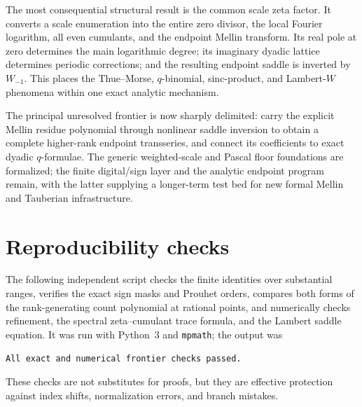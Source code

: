 \documentclass[11pt,oneside]{article}
\theoremstyle{definition}
\theoremstyle{remark}
\begin{document}
The most consequential structural result is the common scale zeta factor.  It converts a scale enumeration into the entire zero divisor, the local Fourier logarithm, all even cumulants, and the endpoint Mellin transform.  Its real pole at zero determines the main logarithmic degree; its imaginary dyadic lattice determines periodic corrections; and the resulting endpoint saddle is inverted by $W_{-1}$.  This places the Thue--Morse, $q$-binomial, sinc-product, and Lambert-$W$ phenomena within one exact analytic mechanism.

The principal unresolved frontier is now sharply delimited: carry the explicit Mellin residue polynomial through nonlinear saddle inversion to obtain a complete higher-rank endpoint transseries, and connect its coefficients to exact dyadic $q$-formulae.  The generic weighted-scale and Pascal floor foundations are formalized; the finite digital/sign layer and the analytic endpoint program remain, with the latter supplying a longer-term test bed for new formal Mellin and Tauberian infrastructure.


\appendix

\section{Reproducibility checks}\label{p3:app:checks}

The following independent script checks the finite identities over substantial ranges, verifies the exact sign masks and Prouhet orders, compares both forms of the rank-generating count polynomial at rational points, and numerically checks refinement, the spectral zeta--cumulant trace formula, and the Lambert saddle equation.  It was run with Python~3 and \texttt{mpmath}; the output was
\begin{center}
\texttt{All exact and numerical frontier checks passed.}
\end{center}
These checks are not substitutes for proofs, but they are effective protection against index shifts, normalization errors, and branch mistakes.
\end{document}
